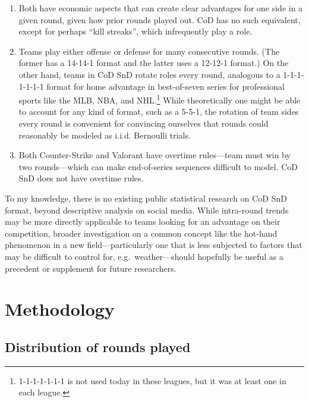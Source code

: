 \documentclass{article}
\providecommand{\tightlist}{%
  \setlength{\itemsep}{0pt}\setlength{\parskip}{0pt}}
\begin{document}
\begin{enumerate}
\def\labelenumi{\arabic{enumi}.}
\tightlist
\item
  Both have economic aspects that can create clear advantages for one
  side in a given round, given how prior rounds played out. CoD has no
  such equivalent, except for perhaps ``kill streaks'', which
  infrequently play a role.
\item
  Teams play either offense or defense for many consecutive rounds. (The
  former has a 14-14-1 format and the latter uses a 12-12-1 format.) On
  the other hand, teams in CoD SnD rotate roles every round, analogous
  to a 1-1-1-1-1-1-1 format for home advantage in best-of-seven series
  for professional sports like the MLB, NBA, and NHL.\footnote{1-1-1-1-1-1-1
    is not used today in these leagues, but it was at least one in each
    league.} While theoretically one might be able to account for any
  kind of format, such as a 5-5-1, the rotation of team sides every
  round is convenient for convincing ourselves that rounds could
  reasonably be modeled as i.i.d. Bernoulli trials.
\item
  Both Counter-Strike and Valorant have overtime rules---team must win
  by two rounds---which can make end-of-series sequences difficult to
  model. CoD SnD does not have overtime rules.
\end{enumerate}

To my knowledge, there is no existing public statistical research on CoD
SnD format, beyond descriptive analysis on social media. While
intra-round trends may be more directly applicable to teams looking for
an advantage on their competition, broader investigation on a common
concept like the hot-hand phenomenon in a new field---particularly one
that is less subjected to factors that may be difficult to control for,
e.g.~weather---should hopefully be useful as a precedent or supplement
for future researchers.

\hypertarget{methodology}{%
\section{Methodology}\label{methodology}}

\hypertarget{distribution-of-rounds-played}{%
\subsection{Distribution of rounds
played}\label{distribution-of-rounds-played}}
\end{document}
